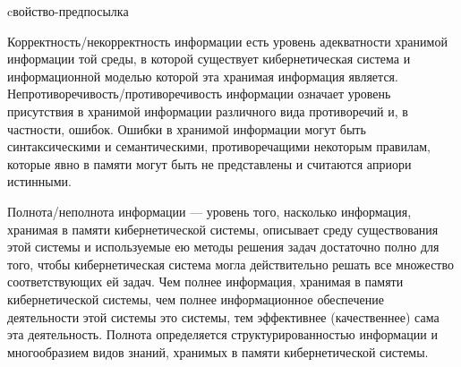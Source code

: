 \begin{SCn}
\begin{scnrelfromlist}{cвойство-предпосылка}
\end{scnrelfromlist}
\end{SCn}

Корректность/некорректность информации есть уровень адекватности хранимой информации той среды, в которой существует кибернетическая система и информационной моделью которой эта хранимая информация является. 
Непротиворечивость/противоречивость информации означает уровень присутствия в хранимой информации различного вида противоречий и, в частности, ошибок. 
Ошибки в хранимой информации могут быть синтаксическими и семантическими, противоречащими некоторым правилам, которые явно в памяти могут быть не представлены и считаются априори истинными.

Полнота/неполнота информации --- уровень того, насколько информация, хранимая в памяти кибернетической системы, описывает среду существования этой системы и используемые ею методы решения задач достаточно полно для того, чтобы кибернетическая система могла действительно решать все множество соответствующих ей задач. 
Чем полнее информация, хранимая в памяти кибернетической системы, чем полнее информационное обеспечение деятельности этой системы это системы, тем эффективнее (качественнее) сама эта деятельность. 
Полнота определяется структурированностью информации и многообразием видов знаний, хранимых в памяти кибернетической системы.

